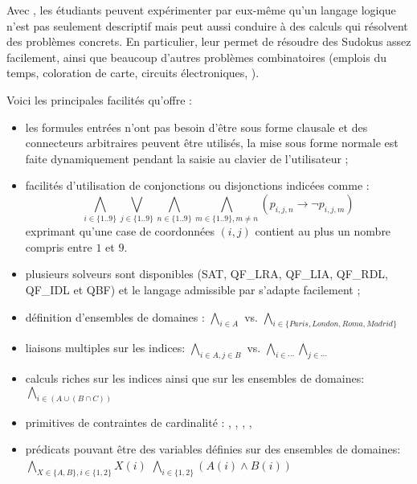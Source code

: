 Avec \touist, les étudiants peuvent expérimenter par eux-même qu'un langage logique n'est pas seulement descriptif mais peut aussi conduire à des calculs qui résolvent des problèmes concrets. En particulier, \touist leur permet de résoudre des Sudokus assez facilement, ainsi que beaucoup d'autres problèmes combinatoires (emplois du temps, coloration de carte, circuits électroniques, \etc).

Voici les principales facilités qu'offre \touist :
\begin{itemize}
\item les formules entrées n'ont pas besoin d'être sous forme clausale et des connecteurs arbitraires peuvent être utilisés, la mise sous forme normale est faite dynamiquement pendant la saisie au clavier de l'utilisateur ;

\item facilités d'utilisation de conjonctions ou disjonctions indicées comme :
\small $$\bigwedge_{i\in\{1..9\}}
  \bigvee_{j\in\{1..9\}}\bigwedge_{n\in\{1..9\}}\bigwedge_{m\in\{1..9\},m\neq
    n}(p_{i,j,n}\rightarrow \lnot p_{i,j,m})$$
\normalsize exprimant qu'une case de coordonnées $(i,j)$ contient au plus un nombre compris entre $1$ et $9$.


\item plusieurs solveurs sont disponibles (SAT, QF\_LRA, QF\_LIA, QF\_RDL, QF\_IDL et QBF) et le langage admissible par \touist s'adapte facilement ;

\item définition d'ensembles de domaines : $\bigwedge_{i\in A}$ vs. $\bigwedge_{i\in\{Paris,London,Roma,Madrid\}}$

\item liaisons multiples sur les indices: $\bigwedge_{i\in A,j\in B}$ vs. $\bigwedge_{i\in \cdots} \bigwedge_{j\in \cdots}$

\item calculs riches sur les indices ainsi que sur les ensembles de domaines: $\bigwedge_{i\in (A\cup (B \cap C))}$

\item primitives de contraintes de cardinalité : , , , , \etc

\item prédicats pouvant être des variables définies sur des ensembles de domaines: $\bigwedge_{X\in \{A,B\},i\in \{1,2\}} X(i)$ \vs $\bigwedge_{i\in \{1,2\}} (A(i) \land B(i))$


\end{itemize}
